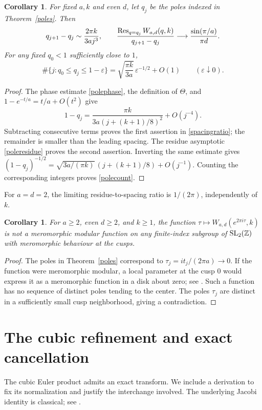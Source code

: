 \documentclass[11pt]{amsart}
\newtheorem{corollary}[theorem]{Corollary}
\theoremstyle{definition}
\theoremstyle{remark}
\numberwithin{equation}{section}
\begin{document}
\begin{corollary}\label{polespacing}
For fixed $a,k$ and even $d$, let $q_j$ be the poles indexed in
Theorem~\ref{poles}. Then
\begin{equation}\label{spacingratio}
 q_{j+1}-q_j\sim\frac{2\pi k}{3aj^3},\qquad
 \frac{\operatorname{Res}_{q=q_j}W_{a,d}(q,k)}{q_{j+1}-q_j}
       \longrightarrow\frac{\sin(\pi/a)}{\pi d}.
\end{equation}
For any fixed $q_0<1$ sufficiently close to $1$,
\begin{equation}\label{polecount}
 \#\{j:q_0\le q_j\le1-\varepsilon\}
 =\sqrt{\frac{\pi k}{3a}}\,\varepsilon^{-1/2}+O(1)
 \qquad(\varepsilon\downarrow0).
\end{equation}
\end{corollary}
\begin{proof}
The phase estimate \eqref{polephase}, the definition of $\Theta$, and
$1-e^{-t/a}=t/a+O(t^2)$ give
\[
 1-q_j=\frac{\pi k}{3a(j+(k+1)/8)^2}+O(j^{-4}).
\]
Subtracting consecutive terms proves the first assertion in
\eqref{spacingratio}; the remainder is smaller than the leading spacing.
The residue asymptotic \eqref{poleresidue} proves the second assertion.
Inverting the same estimate gives
$(1-q_j)^{-1/2}=\sqrt{3a/(\pi k)}\,(j+(k+1)/8)+O(j^{-1})$.
Counting the corresponding integers proves \eqref{polecount}.
\end{proof}

For $a=d=2$, the limiting residue-to-spacing ratio is $1/(2\pi)$,
independently of $k$.

\begin{corollary}\label{nonmodular}
For $a\ge2$, even $d\ge2$, and $k\ge1$, the function
$\tau\mapsto W_{a,d}(e^{2\pi i\tau},k)$ is not a meromorphic modular function on any finite-index subgroup of $\mathrm{SL}_2(\mathbb Z)$ with meromorphic behaviour at the cusps.
\end{corollary}
\begin{proof}
The poles in Theorem~\ref{poles} correspond to $\tau_j=it_j/(2\pi a)\to0$. If the function were meromorphic modular, a local parameter at the cusp $0$ would express it as a meromorphic function in a disk about zero; see \cite{DiamondShurman}. Such a function has no sequence of distinct poles tending to the center. The poles $\tau_j$ are distinct in a sufficiently small cusp neighborhood, giving a contradiction.
\end{proof}

\section{The cubic refinement and exact cancellation}
The cubic Euler product admits an exact transform. We include a derivation to fix its normalization and justify the interchange involved. The underlying Jacobi identity is classical; see \cite{AndrewsAskeyRoy,AndrewsBerndt}.
\end{document}
